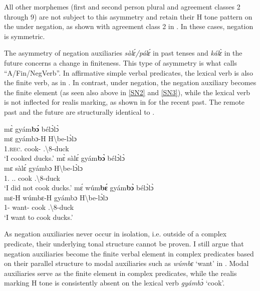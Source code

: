 \documentclass[output=paper,colorlinks=true, citecolor=brown,draftmode]{langscibook}
\begin{document}
All other {\STAMP} morphemes (first and second person plural and agreement classes 2 through 9) are not subject to this asymmetry and retain their H tone pattern on the {\STAMP} under negation, as shown with agreement class 2 in . In these cases, negation is symmetric. 

The asymmetry of negation auxiliaries {\itshape sàlɛ́/pálɛ́} in past tenses and {\itshape kálɛ̀} in the future concerns a change in finiteness. This type of asymmetry is what \citet{Miestamo2007} calls ``A/Fin/NegVerb''. In affirmative simple verbal predicates,  the lexical verb is also the finite verb, as in . In contrast, under negation, the negation auxiliary becomes the finite element (as seen also above in \ref{SN2} and \ref{SN3}), while the lexical verb is not inflected for realis marking, as shown in  for the recent past. The remote past and the future are structurally identical to .

\ea\label{meta2}
\ea\label{meta2a} 
  \glll     mɛ̀ gyám{\bfseries bɔ́} bélɔ̀lɔ̀ \\
          mɛ gyámbɔ-H {H\backslash{}be-lɔ̀lɔ }\\
              1{\SG}.{\textsc{rec.}\PST} cook-{\R} {{\OBJ}.{\LINK}\backslash{}8-duck}\\
    \trans `I cooked ducks.'
\ex\label{meta2b}
  \glll     mɛ̀ sàlɛ́  gyám{\bfseries bɔ̀} bélɔ̀lɔ̀\\
            mɛ sàlɛ́  gyámbɔ {H\backslash{}be-lɔ̀lɔ }\\
              1{\SG}.{\PST} {\NEG}.{\PST}.{\R}  cook {{\OBJ}.{\LINK}\backslash{}8-duck}\\
    \trans `I did not cook ducks.'
\ex\label{meta2c}
  \glll     mɛ́ wúm{\bfseries bɛ́}  gyám{\bfseries bɔ̀} bélɔ̀lɔ̀ \\
            mɛ-H wúmbɛ-H  gyámbɔ {H\backslash{}be-lɔ̀lɔ }\\
              1{\SG}-{\PRS} want-{\R} cook {{\OBJ}.{\LINK}\backslash{}8-duck}\\
    \trans `I want to cook ducks.'
\z 
\z

As negation auxiliaries never occur in isolation, i.e. outside of a complex predicate, their underlying tonal structure cannot be proven. I still argue that negation auxiliaries become the finite verbal element in complex predicates based on their parallel structure to modal auxiliaries such as {\itshape wúmbɛ} `want' in . Modal auxiliaries serve as the finite element in complex predicates, while the realis marking H tone is consistently absent on the lexical verb {\itshape gyámbɔ̀} `cook'.
\end{document}
